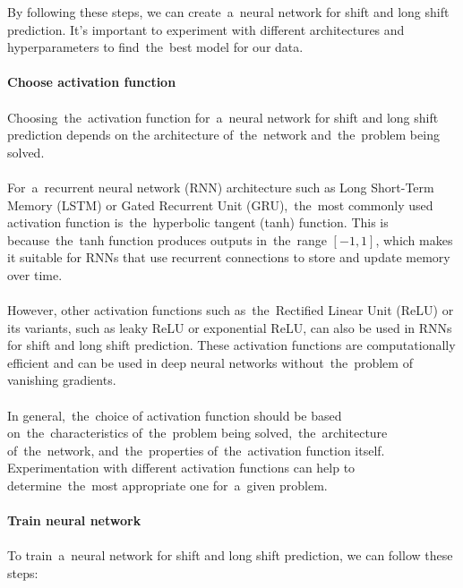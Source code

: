         By following these steps, we can create~a~neural network for shift and long shift prediction.
        It's important to experiment with different architectures and hyperparameters to find~the~best
        model for our data.\\
        \\
        \textbf{Choose activation function}\\
        \\
        Choosing~the~activation function for~a~neural network for shift and long shift prediction depends on the
        architecture of~the~network and~the~problem being solved.\\
        \\
        For~a~recurrent neural network (RNN) architecture such as Long Short-Term Memory (LSTM) or
        Gated Recurrent Unit (GRU),~the~most commonly used activation function is~the~hyperbolic tangent (tanh) function.
        This is because~the~tanh function produces outputs in~the~range $[-1, 1]$, which makes it suitable for RNNs
        that use recurrent connections to store and update memory over time.\\
        \\
        However, other activation functions such as~the~Rectified Linear Unit (ReLU) or its variants, such as leaky
        ReLU or exponential ReLU, can also be used in RNNs for shift and long shift prediction. These activation
        functions are computationally efficient and can be used in deep neural networks without~the~problem of
        vanishing gradients.\\
        \\
        In general,~the~choice of activation function should be based on~the~characteristics of~the~problem being
        solved,~the~architecture of~the~network, and~the~properties of~the~activation function itself.
        Experimentation with different activation functions can help to determine~the~most appropriate one
        for~a~given problem.\\
        \\
        \textbf{Train neural network}\\
        \\
        To train~a~neural network for shift and long shift prediction, we can follow these steps:
